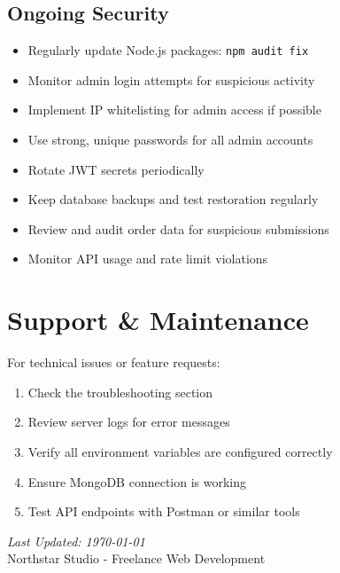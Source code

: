 \documentclass[12pt]{article}
\begin{document}
\subsection{Ongoing Security}

\begin{itemize}
  \item Regularly update Node.js packages: \texttt{npm audit fix}
  \item Monitor admin login attempts for suspicious activity
  \item Implement IP whitelisting for admin access if possible
  \item Use strong, unique passwords for all admin accounts
  \item Rotate JWT secrets periodically
  \item Keep database backups and test restoration regularly
  \item Review and audit order data for suspicious submissions
  \item Monitor API usage and rate limit violations
\end{itemize}

\section{Support \& Maintenance}

For technical issues or feature requests:
\begin{enumerate}
  \item Check the troubleshooting section
  \item Review server logs for error messages
  \item Verify all environment variables are configured correctly
  \item Ensure MongoDB connection is working
  \item Test API endpoints with Postman or similar tools
\end{enumerate}

\vfill

\begin{center}
\textit{Last Updated: \today}\\
Northstar Studio - Freelance Web Development
\end{center}
\end{document}
